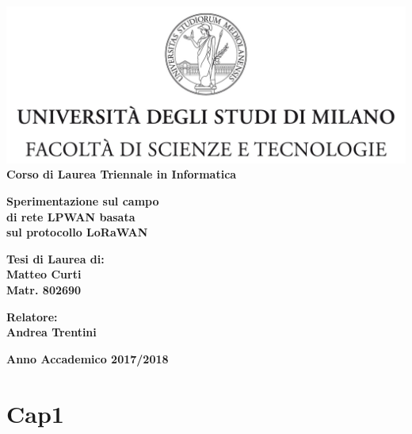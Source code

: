 \documentclass[a4paper]{report} %
\begin{document}
\begin{titlepage}
\begin{center}
\includegraphics[width=\textwidth]{Logo.jpg}\\
{\large{\bf Corso di Laurea Triennale in Informatica}}
\end{center}
\vspace{12mm}
\begin{center}
{\huge{\bf Sperimentazione sul campo}}\\
\vspace{4mm}
{\huge{\bf di rete LPWAN basata}}\\
\vspace{4mm}
{\huge{\bf sul protocollo LoRaWAN}}\\
\end{center}
\vspace{12mm}
\begin{flushright}
{\large{\bf Tesi di Laurea di:}}\\
{\large{\bf Matteo Curti}}\\
{\large{\bf Matr. 802690}}\\
\end{flushright}
\vspace{4mm}
\begin{flushleft}
{\large{\bf Relatore:}}\\
{\large{\bf Andrea Trentini}}\\
\vspace{4mm}
\end{flushleft}
\vspace{12mm}
\begin{center}
{\large{\bf Anno Accademico 2017/2018}}
\end{center}
\end{titlepage}
\tableofcontents
\chapter{Cap1}
\end{document}
